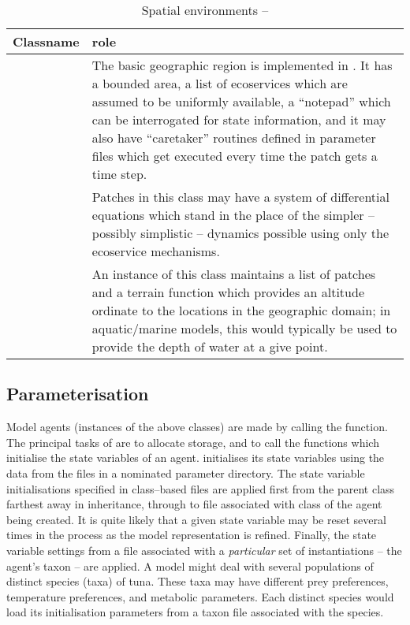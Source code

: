 \begin{table}[H]
\begin{center}
\caption{Spatial environments -- \label{classtableIVb}}
\begin{tabular}{l L{7cm}}
\toprule
\textbf{Classname} & \textbf{role} \\
\midrule
{} & The basic geographic region is implemented in
. It has a bounded area,  a list of ecoservices which
are assumed to be uniformly available, a ``notepad'' which can be
interrogated for state information, and it may also have ``caretaker''
routines defined in parameter files which get executed every time the
patch gets a time step.\\
 & Patches  in this class may have a system of
differential equations which stand in the place of the simpler --
possibly simplistic -- dynamics possible using only the ecoservice
mechanisms.\\
 & An instance of this class maintains a list of
patches and a terrain function which provides an altitude ordinate to
the locations in the geographic domain; in aquatic/marine models, this
would typically be used to provide the depth of water at a give point.\\
\bottomrule
\end{tabular}
\end{center}
\end{table}


\subsection{Parameterisation}

Model agents (instances of the above classes) are made by calling the
 function.  The principal tasks of  are
to allocate storage, and to call the functions which initialise the
state variables of an agent.   initialises its state 
variables using the data from the files in a nominated parameter
directory. The state variable initialisations specified in
class--based files are applied first from the parent class farthest
away in inheritance, through to file associated with class of the
agent being created. It is quite likely that a given state variable
may be reset several times in the process as the model representation
is refined. Finally, the state variable settings from a file
associated with a \emph{particular}\/ set of instantiations -- the
agent's taxon -- are applied.  A model might deal with several
populations of distinct species (taxa) of tuna.  These taxa may have
different prey preferences, temperature preferences, and metabolic
parameters.  Each distinct species would load its initialisation
parameters from a taxon file associated with the species.

